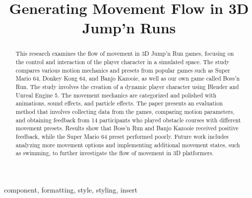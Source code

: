 \documentclass[conference]{IEEEtran}
\begin{document}
\title{Generating Movement Flow in 3D Jump'n Runs}

\author{
\and
{}
\and
{}
}

\maketitle

\begin{abstract}
    This research examines the flow of movement in 3D Jump'n Run games, focusing on the control and interaction of the player character in a simulated space. 
    The study compares various motion mechanics and presets from popular games such as Super Mario 64, Donkey Kong 64, and Banjo Kazooie, as well as our own game called Boss'n Run. 
    The study involves the creation of a dynamic player character using Blender and Unreal Engine 5. 
    The movement mechanics are categorized and polished with animations, sound effects, and particle effects. 
    The paper presents an evaluation method that involves collecting data from the games, comparing motion parameters, and obtaining feedback from 14 participants who played obstacle courses with different movement presets. 
    Results show that Boss'n Run and Banjo Kazooie received positive feedback, while the Super Mario 64 preset performed poorly. 
    Future work includes analyzing more movement options and implementing additional movement states, such as swimming, to further investigate the flow of movement in 3D platformers.
\end{abstract}

\begin{IEEEkeywords}
component, formatting, style, styling, insert
\end{IEEEkeywords}
\end{document}
